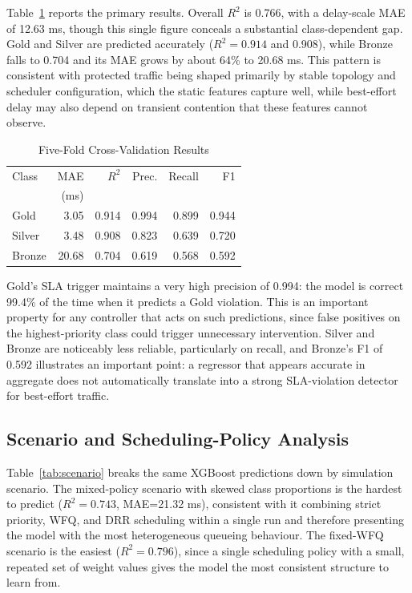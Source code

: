 \documentclass[conference]{IEEEtran}
\begin{document}
Table~\ref{tab:main} reports the primary results. Overall $R^2$ is 0.766, with a delay-scale MAE of 12.63 ms, though this single figure conceals a substantial class-dependent gap. Gold and Silver are predicted accurately ($R^2=0.914$ and 0.908), while Bronze falls to 0.704 and its MAE grows by about 64\% to 20.68 ms. This pattern is consistent with protected traffic being shaped primarily by stable topology and scheduler configuration, which the static features capture well, while best-effort delay may also depend on transient contention that these features cannot observe.

\begin{table}[t]
\caption{Five-Fold Cross-Validation Results}
\label{tab:main}
\centering
\setlength{\tabcolsep}{3.5pt}
\begin{tabular}{lrrrrr}
\toprule
Class & MAE & $R^2$ & Prec. & Recall & F1 \\
 & (ms) & & & & \\
\midrule
Gold   & 3.05  & 0.914 & 0.994 & 0.899 & 0.944 \\
Silver & 3.48  & 0.908 & 0.823 & 0.639 & 0.720 \\
Bronze & 20.68 & 0.704 & 0.619 & 0.568 & 0.592 \\
\bottomrule
\end{tabular}
\end{table}

Gold's SLA trigger maintains a very high precision of 0.994: the model is correct 99.4\% of the time when it predicts a Gold violation. This is an important property for any controller that acts on such predictions, since false positives on the highest-priority class could trigger unnecessary intervention. Silver and Bronze are noticeably less reliable, particularly on recall, and Bronze's F1 of 0.592 illustrates an important point: a regressor that appears accurate in aggregate does not automatically translate into a strong SLA-violation detector for best-effort traffic.

\subsection{Scenario and Scheduling-Policy Analysis}

Table~\ref{tab:scenario} breaks the same XGBoost predictions down by simulation scenario. The mixed-policy scenario with skewed class proportions is the hardest to predict ($R^2=0.743$, MAE=21.32 ms), consistent with it combining strict priority, WFQ, and DRR scheduling within a single run and therefore presenting the model with the most heterogeneous queueing behaviour. The fixed-WFQ scenario is the easiest ($R^2=0.796$), since a single scheduling policy with a small, repeated set of weight values gives the model the most consistent structure to learn from.
\end{document}
